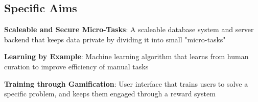 \subsection*{Specific Aims}
\begin{compactenum}
\item \textbf{Scaleable and Secure Micro-Tasks}: A scaleable database system and server backend that keeps data private by dividing it into small "micro-tasks"
\item \textbf{Learning by Example}: Machine learning algorithm that learns from human curation to improve efficiency of manual tasks
\item \textbf{Training through Gamification}: User interface that trains users to solve a specific problem, and keeps them engaged through a reward system 
\end{compactenum}

